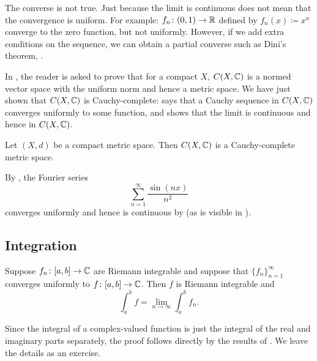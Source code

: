 The converse is not true.  Just because the limit is continuous does not mean
that the convergence is uniform.  For example:
$f_n \colon (0,1) \to {\mathbb{R}}$ defined by $f_n(x) \coloneqq x^n$ converge to
the zero function, but not uniformly.  However, if we add extra conditions
on the sequence, we can obtain a partial converse such as Dini's theorem,
.

In , the reader is asked to prove
that for a compact $X$, $C(X,{\mathbb{C}})$ is a normed vector space
with the uniform norm and hence a metric space.  We have just shown that
$C(X,{\mathbb{C}})$ is Cauchy-complete:   says that a Cauchy
sequence in $C(X,{\mathbb{C}})$ converges uniformly to some function,
and  shows that the limit is
continuous and hence in $C(X,{\mathbb{C}})$.

\begin{cor}
Let $(X,d)$ be a compact metric space.
Then $C(X,{\mathbb{C}})$ is a Cauchy-complete metric space.
\end{cor}

\begin{example}
By ,
the Fourier series 
\begin{equation*}
\sum_{n=1}^\infty \frac{\sin(nx)}{n^2}
\end{equation*}
converges uniformly and hence is continuous by  (as is visible
in ).
\end{example}

\subsection{Integration}

\begin{prop} \label{prop:complexlimitswapintegral}
Suppose $f_n \colon [a,b] \to {\mathbb{C}}$
are Riemann integrable and suppose that $\{ f_n \}_{n=1}^\infty$ converges
uniformly to $f \colon [a,b] \to {\mathbb{C}}$.  Then $f$ is Riemann integrable
and
\begin{equation*}
\int_a^b f = \lim_{n\to \infty} \int_a^b f_n .
\end{equation*}
\end{prop}

Since the integral of a complex-valued function is just the integral of
the real and imaginary parts separately,
the proof follows directly by the results of
.
We leave the details as an exercise.

